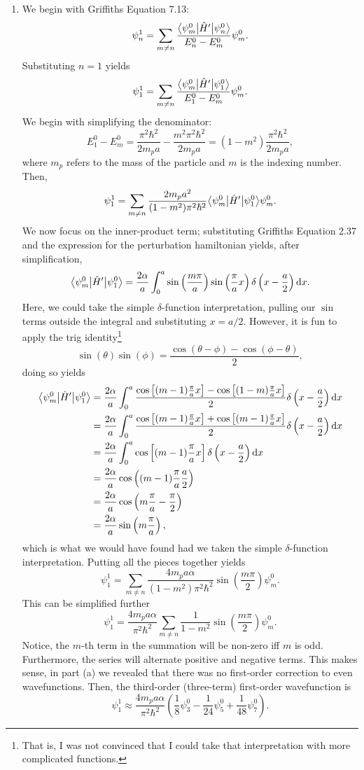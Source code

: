 \documentclass[a4paper, 12pt]{config/homework}
\begin{document}
\begin{enumerate}
\begin{enumerate}[label=(\alph*)]
\pagebreak
\item We begin with Griffiths Equation 7.13:
\[\psi^1_n = \sum_{m\ne n}\frac{\bra*{\psi_m^0}\hat{H}'\ket*{\psi_n^0}}{E_n^0-E_m^0}\psi_m^0.\]
Substituting \(n=1\) yields
\[\psi_1^1 = \sum_{m\ne n}\frac{\bra*{\psi_m^0}\hat{H}'\ket*{\psi_1^0}}{E_1^0-E_m^0}\psi_m^0.\]
We begin with simplifying the denominator:
\[E_1^0 - E_m^0 = \frac{\pi^2\hbar^2}{2m_p a} - \frac{m^2\pi^2\hbar^2}{2m_p a} = (1-m^2)\frac{\pi^2\hbar^2}{2m_p a},\]
where \(m_p\) refers to the mass of the particle and \(m\) is the indexing number. Then,
\[\psi_1^1 = \sum_{m\ne n} \frac{2m_p a^2}{(1-m^2)\pi^2\hbar^2}\bra*{\psi_m^0}\hat{H}'\ket*{\psi_1^0} \psi_m^0.\]
We now focus on the inner-product term; substituting Griffiths Equation 2.37 and the expression for the perturbation hamiltonian yields, after simplification,
\[\bra*{\psi_m^0}\hat{H}'\ket*{\psi_1^0} = \frac{2\alpha}{a}\defint{0}{a}{\sin\left(\frac{m\pi}{a}\right)\sin\left(\frac{\pi}{a}x\right)\delta\left(x-\frac{a}{2}\right)}{x}.\]
Here, we could take the simple \(\delta\)-function interpretation, pulling our \(\sin\) terms outside the integral and substituting \(x=a/2\). However, it is fun to apply the trig identity\footnote{That is, I was not convinced that I could take that interpretation with more complicated functions.}
\[\sin(\theta)\sin(\phi) = \frac{\cos(\theta-\phi) - \cos(\phi-\theta)}{2},\]
doing so yields
\begin{align*}
\bra*{\psi_m^0}\hat{H}'\ket*{\psi_1^0} &= \frac{2\alpha}{a}
\defint{0}{a}{\frac{\cos\left[(m-1)\frac{\pi}{a}x\right]-\cos\left[(1-m)\frac{\pi}{a}x\right]}{2}\delta\left(x-\frac{a}{2}\right)}{x}
\\&= \frac{2\alpha}{a}
\defint{0}{a}{\frac{\cos\left[(m-1)\frac{\pi}{a}x\right]+\cos\left[(m-1)\frac{\pi}{a}x\right]}{2}\delta\left(x-\frac{a}{2}\right)}{x}
\\&= \frac{2\alpha}{a}
\defint{0}{a}{\cos\left[(m-1)\frac{\pi}{a}x\right]\delta\left(x-\frac{a}{2}\right)}{x}
\\&= \frac{2\alpha}{a}
\cos\left((m-1)\frac{\pi}{a}\frac{a}{2}\right)
\\&= \frac{2\alpha}{a} \cos\left(m\frac{\pi}{a} - \frac{\pi}{2}\right)
\\&= \frac{2\alpha}{a} \sin\left(m\frac{\pi}{a}\right),
\end{align*}
which is what we would have found had we taken the simple \(\delta\)-function interpretation. Putting all the pieces together yields
\[\psi_1^1 = \sum_{m\ne n} \frac{4m_p a \alpha}{(1-m^2)\pi^2\hbar^2}\sin\left(\frac{m\pi}{2}\right)\psi_m^0.\]
This can be simplified further
\[\psi_1^1 = \frac{4m_p a \alpha}{\pi^2\hbar^2} \sum_{m\ne n}\frac{1}{1-m^2}\sin\left(\frac{m\pi}{2}\right)\psi_m^0.\]
Notice, the \(m\)-th term in the summation will be non-zero iff \(m\) is odd. Furthermore, the series will alternate positive and negative terms. This makes sense, in part (a) we revealed that there was no first-order correction to even wavefunctions. Then, the third-order (three-term) first-order wavefunction is
\[\psi_1^1 \approx \frac{4m_p a \alpha}{\pi^2\hbar^2}\left(\frac{1}{8}\psi_3^0 - \frac{1}{24}\psi_5^0 + \frac{1}{48}\psi_7^0\right).\]
\end{enumerate}


\end{enumerate}
\end{document}
